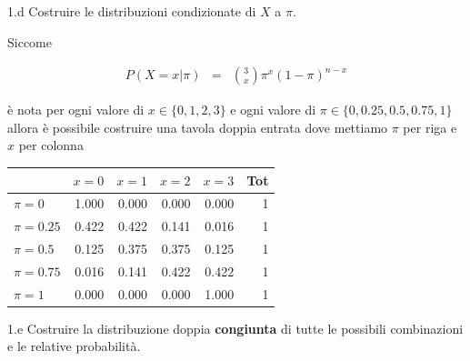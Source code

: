 \documentclass[
  11pt,
]{book}
\theoremstyle{mytheoremstyle}
\theoremstyle{mydefstyle}
\newenvironment{sol}
  {
  \begin{tcolorbox}[enhanced,breakable,arc=0.1mm,boxrule=1pt,colback=white,colframe=iblue,
  title=\bf \fontfamily{lmss}\selectfont \hspace{.5 cm} Soluzione,drop fuzzy shadow]

}{
\end{tcolorbox}
  }
\begin{document}
1.d Costruire le distribuzioni condizionate di \(X\) a \(\pi\).

\begin{sol}

Siccome

\begin{eqnarray*}
  P(X=x|\pi) &=&  \binom{3}{x}\pi^x(1-\pi)^{n-x}
\end{eqnarray*}

è nota per ogni valore di \(x\in\{0,1,2,3\}\) e ogni valore di \(\pi\in\{0,0.25,0.5,0.75,1\}\) allora è possibile costruire una
tavola doppia entrata dove mettiamo \(\pi\) per riga e \(x\) per colonna

\begin{tabular}{lrrrrr}
\toprule
  & $x=0$ & $x=1$ & $x=2$ & $x=3$ & Tot\\
\midrule
$\pi=0$ & 1.000 & 0.000 & 0.000 & 0.000 & 1\\
$\pi=0.25$ & 0.422 & 0.422 & 0.141 & 0.016 & 1\\
$\pi=0.5$ & 0.125 & 0.375 & 0.375 & 0.125 & 1\\
$\pi=0.75$ & 0.016 & 0.141 & 0.422 & 0.422 & 1\\
$\pi=1$ & 0.000 & 0.000 & 0.000 & 1.000 & 1\\
\bottomrule
\end{tabular}

\end{sol}

1.e Costruire la distribuzione doppia \textbf{congiunta} di tutte le possibili combinazioni e le relative probabilità.
\end{document}
